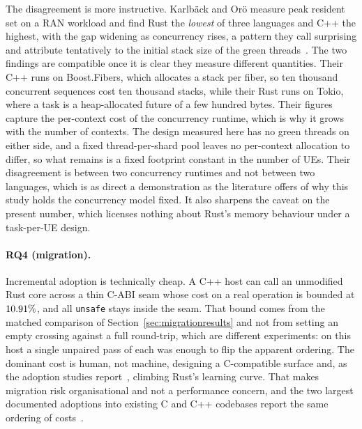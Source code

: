 \documentclass[english,oneside,a4paper,censored,csm,software-track-2020]{HYthesisML}
\begin{document}
The disagreement is more instructive. Karlb\"ack and Or\"o measure peak resident set on a RAN
workload and find Rust the \emph{lowest} of three languages and C++ the highest, with the gap
widening as concurrency rises, a pattern they call surprising and attribute tentatively to the
initial stack size of the green threads~\cite{karlback2021ran}. The two findings are compatible
once it is clear they measure different quantities. Their C++ runs on Boost.Fibers, which
allocates a stack per fiber, so ten thousand concurrent sequences cost ten thousand stacks, while
their Rust runs on Tokio, where a task is a heap-allocated future of a few hundred bytes. Their
figures capture the per-context cost of the concurrency runtime, which is why it grows with the
number of contexts. The design measured here has no green threads on either side, and a fixed
thread-per-shard pool leaves no per-context allocation to differ, so what remains is a fixed
footprint constant in the number of UEs. Their disagreement is between two concurrency runtimes
and not between two languages, which is as direct a demonstration as the literature offers of why
this study holds the concurrency model fixed. It also sharpens the caveat on the present number,
which licenses nothing about Rust's memory behaviour under a task-per-UE design.

\paragraph{RQ4 (migration).} Incremental adoption is technically cheap. A C++ host can call an
unmodified Rust core across a thin C-ABI seam whose cost on a real operation is bounded at
$10.91\%$, and all \texttt{unsafe} stays inside the seam. That bound comes from the
matched comparison of Section~\ref{sec:migrationresults} and not from setting an empty crossing
against a full round-trip, which are different experiments: on this host a single unpaired pass of
each was enough to flip the apparent ordering. The dominant cost is human, not machine,
designing a C-compatible surface and, as the adoption studies
report~\cite{fulton2021adopting,crichton2024learning}, climbing Rust's learning curve. That makes
migration risk organisational and not a performance concern, and the two largest documented
adoptions into existing C and C++ codebases report the same ordering of
costs~\cite{li2026rustlinux,fan2026android}.
\end{document}
